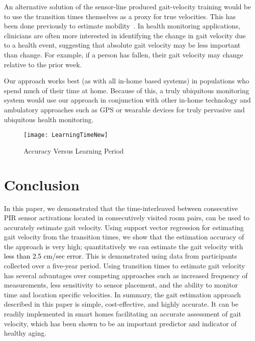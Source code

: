 \documentclass[journal]{IEEEtran}
\newcommand{\RR}[1]{\textcolor{black}{#1}}
\begin{document}
An alternative solution of the sensor-line produced gait-velocity training would be to use the transition times themselves as a proxy for true velocities.  This has been done previously to estimate mobility~\cite{Austin2014}.  In health monitoring applications, clinicians are often more interested in identifying the change in gait velocity due to a health event, suggesting that absolute gait velocity may be less important than change.  For example, if a person has fallen, their gait velocity may change relative to the prior week.

Our approach works best (as with all in-home based systems) in populations who spend much of their time at home.  Because of this, a truly ubiquitous monitoring system would use our approach in conjunction with other in-home technology and ambulatory approaches such as GPS or wearable devices for truly pervasive and ubiquitous health monitoring. 





\begin{figure}
\centering
\texttt{[image: LearningTimeNew]}
\caption{Accuracy Versus Learning Period}
\label{fig:LearningTimeNew}
\end{figure}

\section{Conclusion}
In this paper, we demonstrated that the time-interleaved between consecutive PIR sensor activations located in consecutively visited room pairs, can be used to accurately estimate gait velocity.   Using support vector regression for estimating gait velocity from the transition times, we show that the estimation accuracy of the approach is very high; quantitatively we can estimate the gait velocity with \RR{less than 2.5 cm/sec error}.  This is demonstrated using data from  participants collected over a five-year period.  Using transition times to estimate gait velocity has several advantages over competing approaches such as increased frequency of measurements, less sensitivity to sensor placement, and the ability to monitor time and location specific velocities.  In summary, the gait estimation approach described in this paper is simple, cost-effective, and highly accurate. It can be readily implemented in smart homes facilitating an accurate assessment of gait velocity, which has been shown to be an important predictor and indicator of healthy aging.
\end{document}
